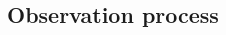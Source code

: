 \documentclass[12pt,english]{article}
\begin{document}
\begin{spacing}{1.9}
\begin{flushleft}
%

\subsection*{Observation process}


\end{flushleft}
\end{spacing}
\end{document}
